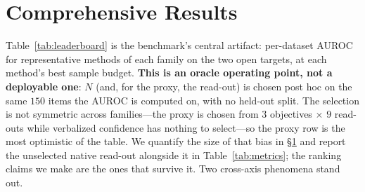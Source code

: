 \documentclass[11pt]{article}
\begin{document}
\section{Comprehensive Results}\label{sec:results}
Table~\ref{tab:leaderboard} is the benchmark's central artifact: per-dataset AUROC for
representative methods of each family on the two open targets, at each method's best
sample budget. \textbf{This is an oracle operating point, not a deployable one}: $N$ (and, for
the proxy, the read-out) is chosen post hoc on the same $150$ items the AUROC is computed on,
with no held-out split. The selection is not symmetric across families---the proxy is chosen
from $3$ objectives $\times$ $9$ read-outs while verbalized confidence has nothing to select---so
the proxy row is the most optimistic of the table. We quantify the size of that bias in
\S\ref{sec:results} and report the unselected native read-out alongside it in
Table~\ref{tab:metrics}; the ranking claims we make are the ones that survive it. Two cross-axis phenomena stand out.
\end{document}

